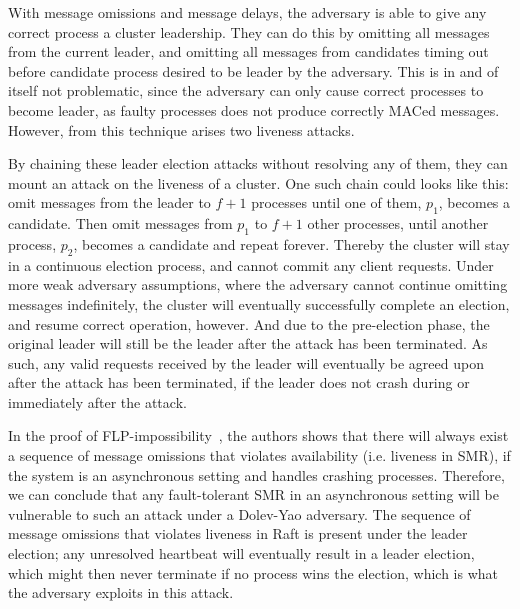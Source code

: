 \documentclass{article}
\begin{document}
		With message omissions and message delays, the adversary is able to give any correct process a cluster leadership.
		They can do this by omitting all messages from the current leader, and omitting all messages from candidates timing out before candidate process desired to be leader by the adversary.
        This is in and of itself not problematic, since the adversary can only cause correct processes to become leader, as faulty processes does not produce correctly MACed messages.
        However, from this technique arises two liveness attacks.

		By chaining these leader election attacks without resolving any of them, they can mount an attack on the liveness of a cluster.
		One such chain could looks like this: omit messages from the leader to $f+1$ processes until one of them, $p_1$, becomes a candidate.
		Then omit messages from $p_1$ to $f+1$ other processes, until another process, $p_2$, becomes a candidate and repeat forever.
		Thereby the cluster will stay in a continuous election process, and cannot commit any client requests.
        Under more weak adversary assumptions, where the adversary cannot continue omitting messages indefinitely, the cluster will eventually successfully complete an election, and resume correct operation, however.
		And due to the pre-election phase, the original leader will still be the leader after the attack has been terminated.
		As such, any valid requests received by the leader will eventually be agreed upon after the attack has been terminated, if the leader does not crash during or immediately after the attack.

		In the proof of FLP-impossibility~\cite{fischer_impossibility_1985}, the authors shows that there will always exist a sequence of message omissions that violates availability (i.e. liveness in SMR), if the system is an asynchronous setting and handles crashing processes.
		Therefore, we can conclude that any fault-tolerant SMR in an asynchronous setting will be vulnerable to such an attack under a Dolev-Yao adversary.
		The sequence of message omissions that violates liveness in Raft is present under the leader election; any unresolved heartbeat will eventually result in a leader election, which might then never terminate if no process wins the election, which is what the adversary exploits in this attack.
\end{document}

